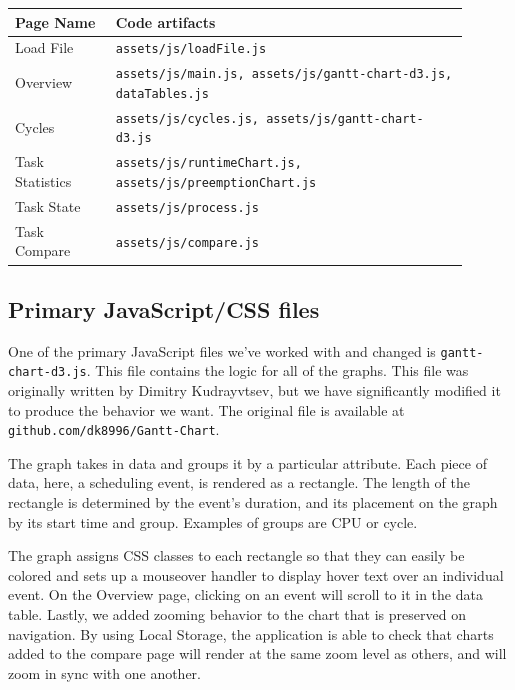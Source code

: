 \documentclass{hmcclinic}
\begin{document}
  \begin{center}
    \begin{tabular}{p{0.2\linewidth}p{0.7\linewidth}}
     \toprule
      Page Name       & Code artifacts     \\
      \midrule
      Load File       & \texttt{assets/js/loadFile.js}\\
      Overview        & \texttt{assets/js/main.js, assets/js/gantt-chart-d3.js, dataTables.js}\\
      Cycles          & \texttt{assets/js/cycles.js, assets/js/gantt-chart-d3.js}\\
      Task Statistics & \texttt{assets/js/runtimeChart.js, assets/js/preemptionChart.js}\\
      Task State      & \texttt{assets/js/process.js}\\
      Task Compare    & \texttt{assets/js/compare.js}\\
    \bottomrule
    \end{tabular}
  \end{center}


  \subsection{Primary JavaScript/CSS files}
  One of the primary JavaScript files we've worked
  with and changed is \texttt{gantt-chart-d3.js}. This file contains the logic for all of the
  graphs. This file was originally written by Dimitry Kudrayvtsev, %
 but we have significantly modified it to produce the behavior we want. The
 original file is available at \texttt{github.com/dk8996/Gantt-Chart}.

  The graph takes in data and groups it by a particular attribute. Each piece
  of data, here, a scheduling event, is rendered as a rectangle. The
  length of the rectangle is determined by the event's duration, and its
  placement on the graph by its start time and group. Examples of groups are
  CPU or cycle.

  The graph assigns CSS classes to each rectangle so that they can easily be
  colored and sets up a mouseover handler to display hover text
  over an individual event. On the Overview page, clicking
  on an event will scroll to it in the data table.
  Lastly, we added zooming behavior to the chart that is
  preserved on navigation. By using Local Storage, the application is
  able to check that charts added to the compare page will render at the
  same zoom level as others, and will zoom in sync with one another.
\end{document}
